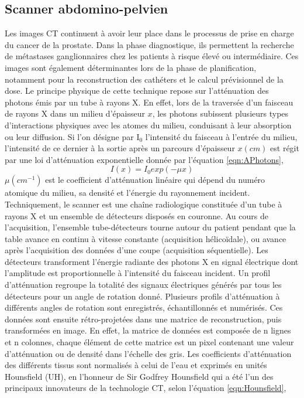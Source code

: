 \subsection*{\textbf{Scanner abdomino-pelvien}}
Les images CT continuent à avoir leur place dans le processus de prise en charge du cancer de la prostate. Dans la phase diagnostique, ils permettent la recherche de métastases ganglionnaires chez les patients à risque élevé ou intermédiaire. Ces images sont également déterminantes lors de la phase de planification, notamment pour la reconstruction des cathéters et le calcul prévisionnel de la dose. Le principe physique de cette technique repose sur l’atténuation des photons émis par un tube à rayons X. En effet, lors de la traversée d’un faisceau de rayons X dans un milieu d’épaisseur $x$, les photons subissent plusieurs types d’interactions physiques avec les atomes du milieu, conduisant à leur absorption ou leur diffusion. Si l’on désigne par I$_{0}$ l’intensité du faisceau à l’entrée du milieu, l’intensité de ce dernier à la sortie après un parcours d’épaisseur $x (cm)$ est régit par une loi d’atténuation exponentielle donnée par l’équation \eqref{eqn:APhotons},
%
\begin{equation}\label{eqn:APhotons}
	I(x)= I_{0} exp\left(-\mu x\right)
\end{equation}
%
$\mu (cm^{-1})$ est le coefficient d’atténuation linéaire qui dépend du numéro atomique du milieu, sa densité et l’énergie du rayonnement incident. Techniquement, le scanner est une chaîne radiologique constituée d'un tube à rayons X et un ensemble de détecteurs disposés en couronne. Au cours de l’acquisition, l’ensemble tube-détecteurs tourne autour du patient pendant que la table avance en continu à vitesse constante (acquisition hélicoïdale), ou avance après l’acquisition des données d’une coupe (acquisition séquentielle). Les détecteurs transforment l’énergie radiante des photons X en signal électrique dont l’amplitude est proportionnelle à l’intensité du faisceau incident. Un profil d’atténuation regroupe la totalité des signaux électriques générés par tous les détecteurs pour un angle de rotation donné. Plusieurs profils d’atténuation à différents angles de rotation sont enregistrés, échantillonnés et numérisés. Ces données sont ensuite rétro-projetées dans une matrice de reconstruction, puis transformées en image.  En effet, la matrice de données est composée de n lignes et  n colonnes, chaque élément de cette matrice est un pixel contenant une valeur d’atténuation ou de densité dans l’échelle des gris. Les coefficients d’atténuation des différents tissus sont normalisés à celui de l’eau et exprimés en unités Hounsfield (UH), en l’honneur de Sir Godfrey Hounsfield qui a été l’un des principaux innovateurs de la technologie CT, selon l’équation \eqref{eqn:Hounsfield},
